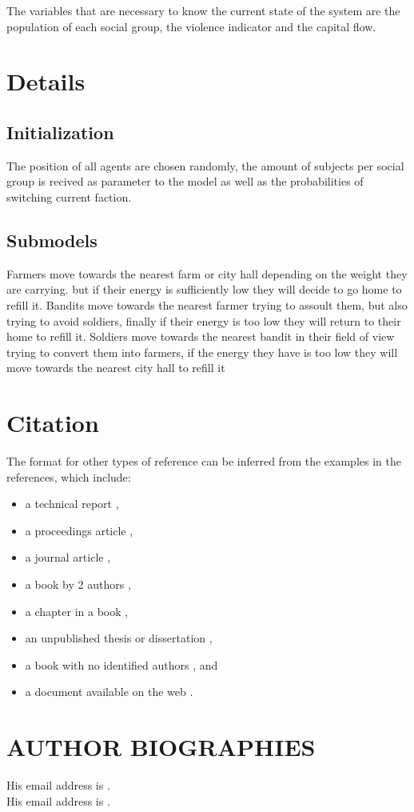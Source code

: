 \documentclass{wscpaperproc}
\theoremstyle{wsc}
\begin{document}
The variables that are necessary to know the current state of the system are
the population of each social group, the violence indicator and the capital
flow.

\section{Details}

\subsection{Initialization}

The position of all agents are chosen randomly, the amount of subjects per
social group is recived as parameter to the model as well as the probabilities
of switching current faction.

\subsection{Submodels}

Farmers move towards the nearest farm or city hall depending on the weight they
are carrying. but if their energy is sufficiently low they will decide to go
home to refill it. Bandits move towards the nearest farmer trying to assoult
them, but also trying to avoid soldiers, finally if their energy is too low
they will return to their home to refill it. Soldiers move towards the nearest
bandit in their field of view trying to convert them into farmers, if the
energy they have is too low they will move towards the nearest city hall to
refill it

\section{Citation}

The format for other types of reference can be inferred from the examples in the references, which include:
\begin{itemize}
\item a technical report \cite{chi89},
\item a proceedings article \cite{cheng:input94},
\item a journal article \cite{gupta:mnormal},
\item a book by 2 authors \cite{hammersley:montecarlo},
\item a chapter in a book \cite{sch79},
\item an unpublished thesis or dissertation \cite{ste99},
\item a book with no identified authors \cite{chicago03}, and
\item a document available on the web \cite{Foundation}.
\end{itemize}




\section*{AUTHOR BIOGRAPHIES}

 His email address is .\\
 His email address is .\\
\end{document}
